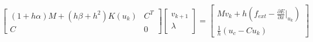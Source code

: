 \documentclass[a4paper,9pt,twocolumn]{extarticle}
\begin{document}
\begin{equation*}
\begin{bmatrix}
	(1 + h\alpha )M + (h\beta + h^2)K(u_k)  & C^T \\
	C & 0
\end{bmatrix}
\begin{bmatrix}
	v_{k + 1} \\
	\lambda
\end{bmatrix}
=
\begin{bmatrix}
	Mv_k + h(f_{ext} - \frac{\partial E}{\partial x}\bigg|_{u_k})  \\
	\frac{1}{h} (u_c - Cu_k)
\end{bmatrix}
\end{equation*}

 
\end{document}
